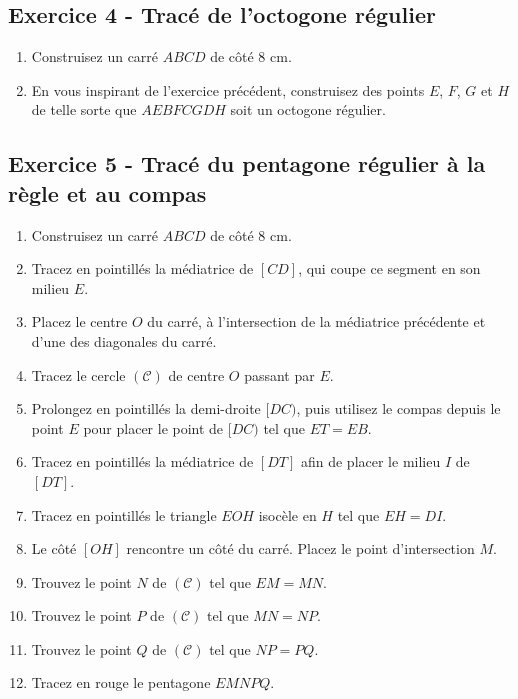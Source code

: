 \documentclass[14 pt]{extarticle}
\theoremstyle{plain}
\begin{document}
\subsection*{Exercice 4 - Tracé de l'octogone régulier}


\begin{enumerate}

\item Construisez un carré $ABCD$ de côté $8$ cm. 
\item En vous inspirant de l'exercice précédent, construisez des points $E$, $F$, $G$ et $H$ de telle sorte que $AEBFCGDH$ soit un octogone régulier.
\end{enumerate}


\subsection*{Exercice 5 - Tracé du pentagone régulier à la règle et au compas}


\begin{enumerate}

\item Construisez un carré $ABCD$ de côté $8$ cm. 
\item Tracez en pointillés la médiatrice de $[CD]$, qui coupe ce segment en son milieu $E$. 
\item Placez le centre $O$ du carré, à l'intersection de la médiatrice précédente et d'une des diagonales du carré. 
\item Tracez le cercle $(\mathcal C)$ de centre $O$ passant par $E$. 
\item Prolongez en pointillés la demi-droite $[DC)$, puis utilisez le compas depuis le point $E$ pour placer le point de $[DC)$ tel que $ET=EB$. 
\item Tracez en pointillés la médiatrice de $[DT]$ afin de placer le milieu $I$ de $[DT]$. 
\item Tracez en pointillés le triangle $EOH$ isocèle en $H$ tel que $EH= DI$. 
\item Le côté $[OH]$ rencontre un côté du carré. Placez le point d'intersection $M$.
\item Trouvez le point $N$ de $(\mathcal C)$ tel que $EM= MN$. 
\item Trouvez le point $P$ de $(\mathcal C)$ tel que $MN=NP$. 
\item Trouvez le point $Q$ de $(\mathcal C)$ tel que $NP=PQ$. 
\item Tracez en rouge le pentagone $EMNPQ$. 
\end{enumerate}
\end{document}

